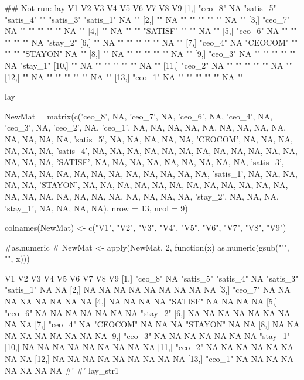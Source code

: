 \documentclass[a4paper]{book}
\begin{document}
\begin{Examples}
\begin{ExampleCode}

\#\# Not run: 
lay
V1      V2 V3        V4        V5       V6        V7        V8 V9
[1,] "ceo_8" NA "satis_5" "satis_4" ""       "satis_3" "satis_1" NA ""
[2,] ""      NA ""        ""        ""       ""        ""        NA ""
[3,] "ceo_7" NA ""        ""        ""       ""        ""        NA ""
[4,] ""      NA ""        ""        "SATISF" ""        ""        NA ""
[5,] "ceo_6" NA ""        ""        ""       ""        ""        NA "stay_2"
[6,] ""      NA ""        ""        ""       ""        ""        NA ""
[7,] "ceo_4" NA "CEOCOM"  ""        ""       ""        "STAYON"  NA ""
[8,] ""      NA ""        ""        ""       ""        ""        NA ""
[9,] "ceo_3" NA ""        ""        ""       ""        ""        NA "stay_1"
[10,] ""      NA ""        ""        ""       ""        ""        NA ""
[11,] "ceo_2" NA ""        ""        ""       ""        ""        NA ""
[12,] ""      NA ""        ""        ""       ""        ""        NA ""
[13,] "ceo_1" NA ""        ""        ""       ""        ""        NA ""

lay %


NewMat = matrix(c('ceo_8', NA, 'ceo_7', NA, 'ceo_6',
NA, 'ceo_4', NA, 'ceo_3', NA, 'ceo_2', NA, 'ceo_1',
NA, NA, NA, NA, NA, NA, NA, NA, NA, NA, NA, NA, NA,
'satis_5', NA, NA, NA, NA, NA, 'CEOCOM', NA, NA, NA,
NA, NA, NA, 'satis_4', NA, NA, NA, NA, NA, NA, NA,
 NA, NA, NA, NA, NA, NA, NA, NA, 'SATISF', NA, NA,
  NA, NA, NA, NA, NA, NA, NA, 'satis_3', NA, NA,
  NA, NA, NA, NA, NA, NA, NA, NA, NA, NA, 'satis_1',
  NA, NA, NA, NA, NA, 'STAYON', NA, NA, NA, NA, NA,
  NA, NA, NA, NA, NA, NA, NA, NA, NA, NA, NA, NA,
   NA, NA, NA, NA, NA, NA, 'stay_2', NA, NA, NA,
   'stay_1', NA, NA, NA, NA), nrow = 13, ncol = 9)


colnames(NewMat) <- c("V1", "V2", "V3", "V4", "V5", "V6", "V7", "V8", "V9")

#as.numeric
# NewMat <- apply(NewMat, 2, function(x) as.numeric(gsub("'", "", x)))

V1      V2 V3        V4        V5       V6        V7        V8 V9
[1,] "ceo_8" NA "satis_5" "satis_4" NA       "satis_3" "satis_1" NA NA
[2,] NA      NA NA        NA        NA       NA        NA        NA NA
[3,] "ceo_7" NA NA        NA        NA       NA        NA        NA NA
[4,] NA      NA NA        NA        "SATISF" NA        NA        NA NA
[5,] "ceo_6" NA NA        NA        NA       NA        NA        NA "stay_2"
[6,] NA      NA NA        NA        NA       NA        NA        NA NA
[7,] "ceo_4" NA "CEOCOM"  NA        NA       NA        "STAYON"  NA NA
[8,] NA      NA NA        NA        NA       NA        NA        NA NA
[9,] "ceo_3" NA NA        NA        NA       NA        NA        NA "stay_1"
[10,] NA      NA NA        NA        NA       NA        NA        NA NA
[11,] "ceo_2" NA NA        NA        NA       NA        NA        NA NA
[12,] NA      NA NA        NA        NA       NA        NA        NA NA
[13,] "ceo_1" NA NA        NA        NA       NA        NA        NA NA
#' #'
 lay_str1 %



\end{ExampleCode}
\end{Examples}
\end{document}
